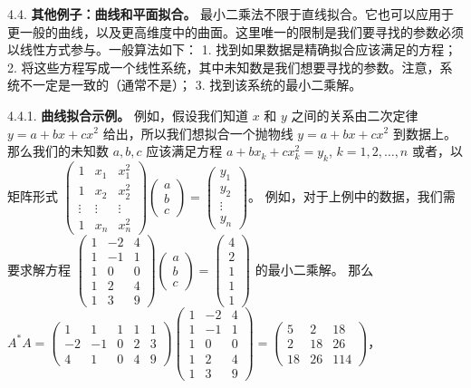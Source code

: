 4.4. \textbf{其他例子：曲线和平面拟合。} 最小二乘法不限于直线拟合。它也可以应用于更一般的曲线，以及更高维度中的曲面。这里唯一的限制是我们要寻找的参数必须以线性方式参与。一般算法如下：
1. 找到如果数据是精确拟合应该满足的方程；
2. 将这些方程写成一个线性系统，其中未知数是我们想要寻找的参数。注意，系统不一定是一致的（通常不是）；
3. 找到该系统的最小二乘解。

4.4.1. \textbf{曲线拟合示例。} 例如，假设我们知道 $x$ 和 $y$ 之间的关系由二次定律 $y = a + bx + cx^2$ 给出，所以我们想拟合一个抛物线 $y = a + bx + cx^2$ 到数据上。那么我们的未知数 $a, b, c$ 应该满足方程
$a + bx_k + cx_k^2 = y_k$, $k = 1, 2, \dots, n$
或者，以矩阵形式
$\begin{pmatrix} 1 & x_1 & x_1^2 \\ 1 & x_2 & x_2^2 \\ \vdots & \vdots & \vdots \\ 1 & x_n & x_n^2 \end{pmatrix} \begin{pmatrix} a \\ b \\ c \end{pmatrix} = \begin{pmatrix} y_1 \\ y_2 \\ \vdots \\ y_n \end{pmatrix}$。
例如，对于上例中的数据，我们需要求解方程
$\begin{pmatrix} 1 & -2 & 4 \\ 1 & -1 & 1 \\ 1 & 0 & 0 \\ 1 & 2 & 4 \\ 1 & 3 & 9 \end{pmatrix} \begin{pmatrix} a \\ b \\ c \end{pmatrix} = \begin{pmatrix} 4 \\ 2 \\ 1 \\ 1 \\ 1 \end{pmatrix}$
的最小二乘解。
那么 $A^*A = \begin{pmatrix} 1 & 1 & 1 & 1 & 1 \\ -2 & -1 & 0 & 2 & 3 \\ 4 & 1 & 0 & 4 & 9 \end{pmatrix} \begin{pmatrix} 1 & -2 & 4 \\ 1 & -1 & 1 \\ 1 & 0 & 0 \\ 1 & 2 & 4 \\ 1 & 3 & 9 \end{pmatrix} = \begin{pmatrix} 5 & 2 & 18 \\ 2 & 18 & 26 \\ 18 & 26 & 114 \end{pmatrix}$，

